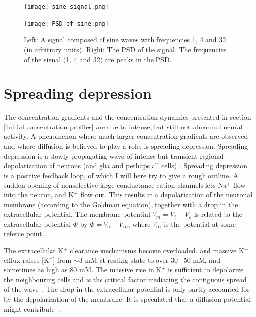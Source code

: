 \documentclass{uiophd}
\begin{document}
\begin{figure}[!tbp]
  \centering
  \begin{minipage}[b]{0.475\textwidth}
    \texttt{[image: sine\_signal.png]}
  \end{minipage}
  \hfill
  \begin{minipage}[b]{0.475\textwidth}
    \texttt{[image: PSD\_of\_sine.png]}
  \end{minipage}  
   \caption{Left: A signal composed of sine waves with frequencies 1, 4 and 32 (in arbitrary units).  Right: The PSD of the signal. The frequencies of the signal (1, 4 and 32) are peaks in the PSD. }
  \label{fig:PSD_of_sine}
\end{figure}

\section{Spreading depression}\label{SD}
The concentration gradients and the concentration dynamics presented in section \ref{Initial concentration profiles} are due to intense, but still not abnormal neural activity. A phenomenon where much larger concentration gradients are observed and where diffusion is believed to play a role, is spreading depression. Spreading depression is a slowly propagating wave of intense but transient
regional depolarization of neurons (and glia and perhaps all cells) \cite{Ataya2015}. Spreading depression is a positive feedback loop, of which I will here try to give a rough outline. A sudden opening of nonselective large-conductance cation channels lets Na$^+$ flow into the neuron, and K$^+$ flow out. This results in a depolarization of the neuronal membrane (according to the Goldman equation), together with a drop in the extracellular potential. The membrane potential $V_m=V_i-V_o$ is related to the extracellular potential $\Phi$ by $\Phi = V_o - V_{\infty}$, where $V_{\infty}$ is the potential at some referce point. 

The extracellular K$^+$ clearance mechanisms become overloaded, and massive K$^+$ efflux raises [K$^+$] from $ \sim 3$ mM at resting state
to over 30 –50 mM, and sometimes as
high as 80 mM. The massive rise in K$^+$ is sufficient to depolarize the neighbouring cells and is the critical factor mediating the contiguous spread of
the wave~\cite{Ataya2015}. The drop in the extracellular potential is only partly accounted for by the depolarization of the membrane. It is speculated that a diffusion potential might contribute~\cite{Herreras1993}. 
\end{document}
